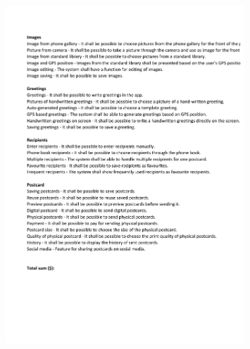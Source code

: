 \documentclass[10pt,a4paper]{article}
\begin{document}
\begin{appendices}
\begin{figure}[h!]
\centering
\includegraphics[page=2,width=0.8\textwidth]{100Method.pdf}
\end{figure}

\FloatBarrier

\newpage


\end{appendices}
\end{document}
